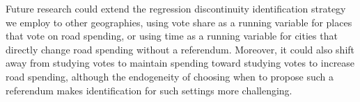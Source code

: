 \noindent Future research could extend the regression discontinuity identification strategy we employ to other geographies, using vote share as a running variable for places that vote on road spending, or using time as a running variable for cities that directly change road spending without a referendum. Moreover, it could also shift away from studying votes to maintain spending toward studying votes to increase road spending, although the endogeneity of choosing when to propose such a referendum makes identification for such settings more challenging.


